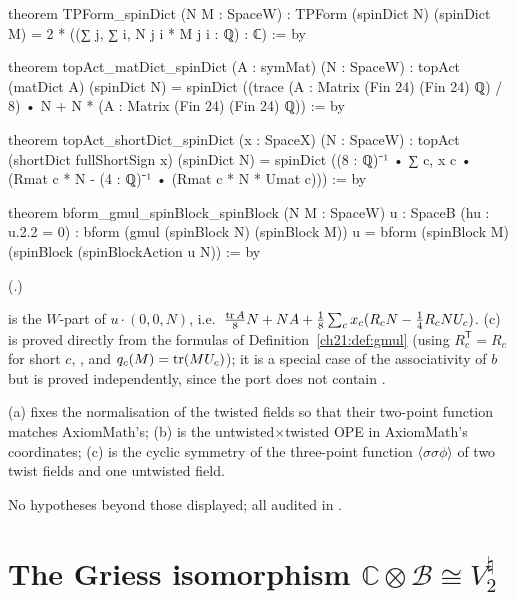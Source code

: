 \begin{leancode}
theorem TPForm_spinDict (N M : SpaceW) :
    TPForm (spinDict N) (spinDict M) = 2 * ((∑ j, ∑ i, N j i * M j i : ℚ) : ℂ) := by
\end{leancode}
\begin{leancode}
theorem topAct_matDict_spinDict (A : symMat) (N : SpaceW) :
    topAct (matDict A) (spinDict N)
      = spinDict ((trace (A : Matrix (Fin 24) (Fin 24) ℚ) / 8) • N + N * (A : Matrix (Fin 24) (Fin 24) ℚ)) := by
\end{leancode}
\begin{leancode}
theorem topAct_shortDict_spinDict (x : SpaceX) (N : SpaceW) :
    topAct (shortDict fullShortSign x) (spinDict N)
      = spinDict ((8 : ℚ)⁻¹ • ∑ c, x c • (Rmat c * N - (4 : ℚ)⁻¹ • (Rmat c * N * Umat c))) := by
\end{leancode}
\begin{leancode}
theorem bform_gmul_spinBlock_spinBlock (N M : SpaceW) {u : SpaceB} (hu : u.2.2 = 0) :
    bform (gmul (spinBlock N) (spinBlock M)) u
      = bform (spinBlock M) (spinBlock (spinBlockAction u N)) := by
\end{leancode}
(.)
\begin{dictionary}
 is the $W$-part of $u\cdot(0,0,N)$, i.e.\
$\tfrac{\operatorname{tr} A}8N+NA+\tfrac18\sum_cx_c(R_cN-\tfrac14R_cNU_c)$.  (c) is proved directly from the formulas
of Definition~\ref{ch21:def:gmul} (using $R_c^{\mathsf T}=R_c$ for short $c$, ,
and $q_c(M)=\operatorname{tr}(MU_c)$); it is a special case of the associativity of $b$ but is proved independently, since
the port does not contain \lean{bform_gmul_assoc}.
\end{dictionary}
\begin{physics}
(a) fixes the normalisation of the twisted fields so that their two-point function matches
AxiomMath's; (b) is the untwisted$\times$twisted OPE in AxiomMath's coordinates; (c) is the
cyclic symmetry of the three-point function $\langle\sigma\sigma\phi\rangle$ of two twist fields and one
untwisted field.
\end{physics}
\begin{status}
No hypotheses beyond those displayed; all audited in .
\end{status}

\section{The Griess isomorphism \texorpdfstring{$\mathbb C\otimes\mathcal B\cong V^\natural_2$}{C (x) B = V-natural\_2}}\label{ch21:sec:iso}


